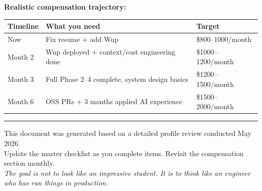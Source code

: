 \documentclass[11pt, a4paper]{article}
\begin{document}
\noindent\textbf{Realistic compensation trajectory:}

\begin{tabularx}{\linewidth}{lXl}
\toprule
\textbf{Timeline} & \textbf{What you need} & \textbf{Target} \\
\midrule
Now & Fix resume + add Wup & \$800--1000/month \\
Month 2 & Wup deployed + context/cost engineering done & \$1000--1200/month \\
Month 3 & Full Phase 2--4 complete, system design basics & \$1200--1500/month \\
Month 6 & OSS PRs + 3 months applied AI experience & \$1500--2000/month \\
\bottomrule
\end{tabularx}

\vspace{24pt}
\textcolor{border}{\rule{\linewidth}{0.4pt}}
\vspace{6pt}

\begin{center}
\small\color{muted}
This document was generated based on a detailed profile review conducted May 2026.\\
Update the master checklist as you complete items. Revisit the compensation section monthly.\\
\vspace{4pt}
\textit{The goal is not to look like an impressive student. It is to think like an engineer who has run things in production.}
\end{center}
\end{document}

